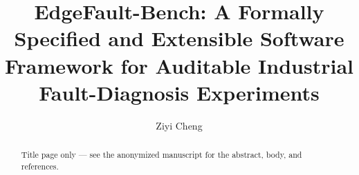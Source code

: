 \documentclass[acmsmall]{acmart}
\begin{document}
\title{EdgeFault-Bench: A Formally Specified and Extensible Software Framework
for Auditable Industrial Fault-Diagnosis Experiments}

\author{Ziyi Cheng}

\begin{abstract}
\noindent Title page only --- see the anonymized manuscript for the abstract,
body, and references.
\end{abstract}

\maketitle
\end{document}
